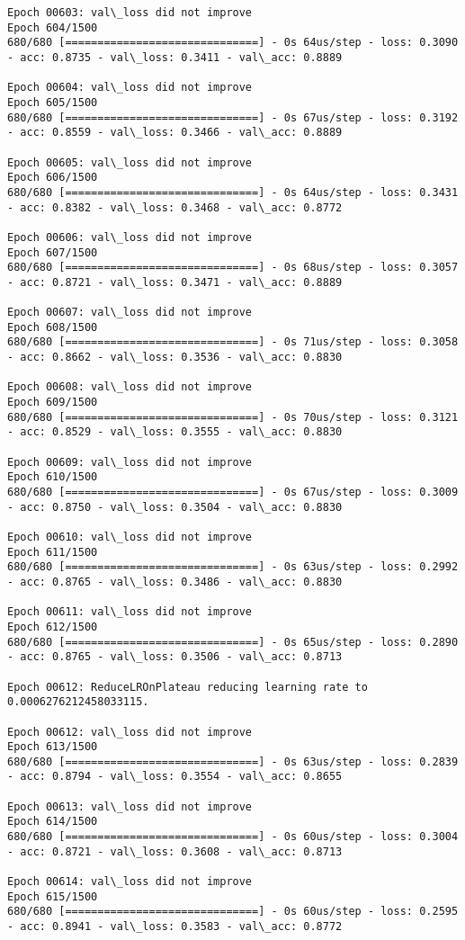 \documentclass[11pt]{article}
\begin{document}
\begin{Verbatim}[commandchars=\\\{\}]
Epoch 00603: val\_loss did not improve
Epoch 604/1500
680/680 [==============================] - 0s 64us/step - loss: 0.3090 - acc: 0.8735 - val\_loss: 0.3411 - val\_acc: 0.8889

Epoch 00604: val\_loss did not improve
Epoch 605/1500
680/680 [==============================] - 0s 67us/step - loss: 0.3192 - acc: 0.8559 - val\_loss: 0.3466 - val\_acc: 0.8889

Epoch 00605: val\_loss did not improve
Epoch 606/1500
680/680 [==============================] - 0s 64us/step - loss: 0.3431 - acc: 0.8382 - val\_loss: 0.3468 - val\_acc: 0.8772

Epoch 00606: val\_loss did not improve
Epoch 607/1500
680/680 [==============================] - 0s 68us/step - loss: 0.3057 - acc: 0.8721 - val\_loss: 0.3471 - val\_acc: 0.8889

Epoch 00607: val\_loss did not improve
Epoch 608/1500
680/680 [==============================] - 0s 71us/step - loss: 0.3058 - acc: 0.8662 - val\_loss: 0.3536 - val\_acc: 0.8830

Epoch 00608: val\_loss did not improve
Epoch 609/1500
680/680 [==============================] - 0s 70us/step - loss: 0.3121 - acc: 0.8529 - val\_loss: 0.3555 - val\_acc: 0.8830

Epoch 00609: val\_loss did not improve
Epoch 610/1500
680/680 [==============================] - 0s 67us/step - loss: 0.3009 - acc: 0.8750 - val\_loss: 0.3504 - val\_acc: 0.8830

Epoch 00610: val\_loss did not improve
Epoch 611/1500
680/680 [==============================] - 0s 63us/step - loss: 0.2992 - acc: 0.8765 - val\_loss: 0.3486 - val\_acc: 0.8830

Epoch 00611: val\_loss did not improve
Epoch 612/1500
680/680 [==============================] - 0s 65us/step - loss: 0.2890 - acc: 0.8765 - val\_loss: 0.3506 - val\_acc: 0.8713

Epoch 00612: ReduceLROnPlateau reducing learning rate to 0.0006276212458033115.

Epoch 00612: val\_loss did not improve
Epoch 613/1500
680/680 [==============================] - 0s 63us/step - loss: 0.2839 - acc: 0.8794 - val\_loss: 0.3554 - val\_acc: 0.8655

Epoch 00613: val\_loss did not improve
Epoch 614/1500
680/680 [==============================] - 0s 60us/step - loss: 0.3004 - acc: 0.8721 - val\_loss: 0.3608 - val\_acc: 0.8713

Epoch 00614: val\_loss did not improve
Epoch 615/1500
680/680 [==============================] - 0s 60us/step - loss: 0.2595 - acc: 0.8941 - val\_loss: 0.3583 - val\_acc: 0.8772


\end{Verbatim}
\end{document}
